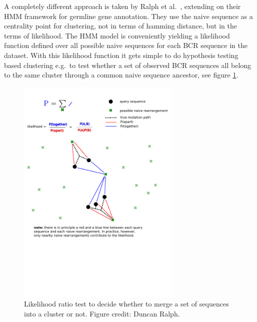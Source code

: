 A completely different approach is taken by Ralph et al.\ \cite{ralph2016likelihood}, extending on their HMM framework for germline gene annotation.
They use the naive sequence as a centrality point for clustering, not in terms of hamming distance, but in the terms of likelihood.
The HMM model is conveniently yielding a likelihood function defined over all possible naive sequences for each BCR sequence in the dataset.
With this likelihood function it gets simple to do hypothesis testing based clustering e.g.\ to test whether a set of observed BCR sequences all belong to the same cluster through a common naive sequence ancestor, see figure \ref{fig:partis_clustering-with-likelihood_2}.

\begin{figure}
    \centering
    \includegraphics[width=0.7\textwidth]{figures/partis_clustering-with-likelihood_2.pdf}
    \caption{
        \label{fig:partis_clustering-with-likelihood_2}
        Likelihood ratio test to decide whether to merge a set of sequences into a cluster or not. Figure credit: Duncan Ralph.
    }
\end{figure}


